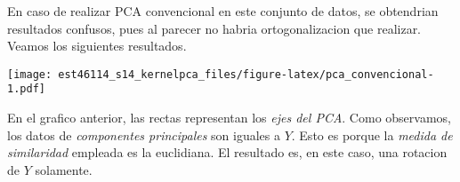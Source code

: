 \documentclass[11pt,]{article}
\newenvironment{Shaded}{\begin{snugshade}}{\end{snugshade}}
\newcommand{\KeywordTok}[1]{\textcolor[rgb]{0.13,0.29,0.53}{\textbf{#1}}}
\newcommand{\DataTypeTok}[1]{\textcolor[rgb]{0.13,0.29,0.53}{#1}}
\newcommand{\DecValTok}[1]{\textcolor[rgb]{0.00,0.00,0.81}{#1}}
\newcommand{\FloatTok}[1]{\textcolor[rgb]{0.00,0.00,0.81}{#1}}
\newcommand{\StringTok}[1]{\textcolor[rgb]{0.31,0.60,0.02}{#1}}
\newcommand{\CommentTok}[1]{\textcolor[rgb]{0.56,0.35,0.01}{\textit{#1}}}
\newcommand{\OperatorTok}[1]{\textcolor[rgb]{0.81,0.36,0.00}{\textbf{#1}}}
\newcommand{\NormalTok}[1]{#1}
\begin{document}
En caso de realizar PCA convencional en este conjunto de datos, se
obtendrian resultados confusos, pues al parecer no habria
ortogonalizacion que realizar. Veamos los siguientes resultados.

\begin{Shaded}
\end{Shaded}

\texttt{[image: est46114\_s14\_kernelpca\_files/figure-latex/pca\_convencional-1.pdf]}

En el grafico anterior, las rectas representan los \emph{ejes del PCA}.
Como observamos, los datos de \emph{componentes principales} son iguales
a \(Y\). Esto es porque la \emph{medida de similaridad} empleada es la
euclidiana. El resultado es, en este caso, una rotacion de \(Y\)
solamente.
\end{document}
